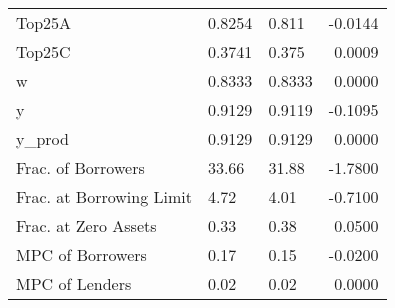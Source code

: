 \begin{table}
\begin{tabular}{lllr}
                  Top25A &  0.8254 &    0.811 & -0.0144 \\
                  Top25C &  0.3741 &    0.375 &  0.0009 \\
                       w &  0.8333 &   0.8333 &  0.0000 \\
                       y &  0.9129 &   0.9119 & -0.1095 \\
                  y\_prod &  0.9129 &   0.9129 &  0.0000 \\
      Frac. of Borrowers &   33.66 &    31.88 & -1.7800 \\
Frac. at Borrowing Limit &    4.72 &     4.01 & -0.7100 \\
    Frac. at Zero Assets &    0.33 &     0.38 &  0.0500 \\
        MPC of Borrowers &    0.17 &     0.15 & -0.0200 \\
          MPC of Lenders &    0.02 &     0.02 &  0.0000 \\
\bottomrule
\end{tabular}
\end{table}
